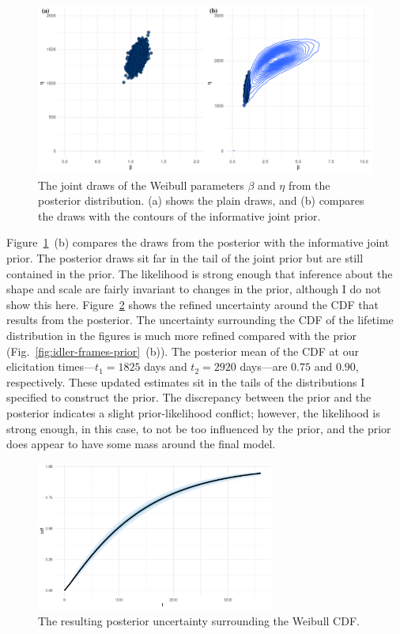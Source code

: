 \begin{figure}
  \centering
  \includegraphics[width=1\textwidth]{./figures/ch-3/idler-frame-post.pdf}
  \caption{The joint draws of the Weibull parameters $\beta$ and $\eta$ from the posterior distribution. (a) shows the plain draws, and (b) compares the draws with the contours of the informative joint prior.}
  \label{fig:idler-frames-post}
\end{figure}

Figure~\ref{fig:idler-frames-post}~(b) compares the draws from the posterior with the informative joint prior. The posterior draws sit far in the tail of the joint prior but are still contained in the prior. The likelihood is strong enough that inference about the shape and scale are fairly invariant to changes in the prior, although I do not show this here. Figure~\ref{fig:idler-frames-post-cdf} shows the refined uncertainty around the CDF that results from the posterior. The uncertainty surrounding the CDF of the lifetime distribution in the figures is much more refined compared with the prior (Fig.~\ref{fig:idler-frames-prior}~(b)). The posterior mean of the CDF at our elicitation times---$t_1 = 1825$ days and $t_2 = 2920$ days---are $0.75$ and $0.90$, respectively. These updated estimates sit in the tails of the distributions I specified to construct the prior. The discrepancy between the prior and the posterior indicates a slight prior-likelihood conflict; however, the likelihood is strong enough, in this case, to not be too influenced by the prior, and the prior does appear to have some mass around the final model.

\begin{figure}
  \centering
  \includegraphics[width=0.7\textwidth]{./figures/ch-3/idler-frame-post-CDF.pdf}
  \caption{The resulting posterior uncertainty surrounding the Weibull CDF.}
  \label{fig:idler-frames-post-cdf}
\end{figure}

